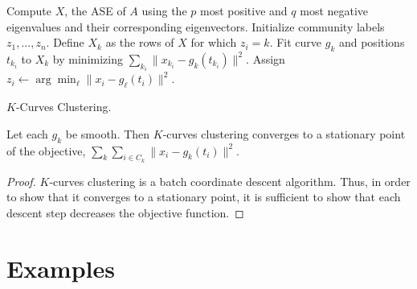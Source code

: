 \documentclass[12pt]{article}
\begin{document}
\begin{algorithm}[h]
  \DontPrintSemicolon
  \SetAlgoLined
    Compute $X$, the ASE of $A$ using the $p$ most positive and $q$ most negative eigenvalues and their corresponding eigenvectors.\;
    Initialize community labels $z_1, ..., z_n$.\;
     {
       {
        Define $X_k$ as the rows of $X$ for which $z_i = k$.\;
        Fit curve $g_k$ and positions $t_{k_i}$ to $X_k$ by minimizing $\sum_{k_i} \|x_{k_i} - g_k(t_{k_i})\|^2$.\;
      }
       {
        Assign $z_i \leftarrow \arg\min_\ell \|x_i - g_\ell(t_i)\|^2$.\
      }
    }
  \caption{$K$-Curves Clustering.}
\end{algorithm}

\begin{theorem}
\label{k-curves-clustering}
Let each $g_k$ be smooth. 
Then $K$-curves clustering converges to a stationary point of the objective, 
$\sum_k \sum_{i \in C_k} \|x_i - g_k(t_i)\|^2$.
\end{theorem}

\begin{proof}
$K$-curves clustering is a batch coordinate descent algorithm. 
Thus, in order to show that it converges to a stationary point, it is sufficient to show that each descent step decreases the objective function. 
\end{proof}

\hypertarget{examples}{%
\section{Examples}\label{examples}}
\end{document}
